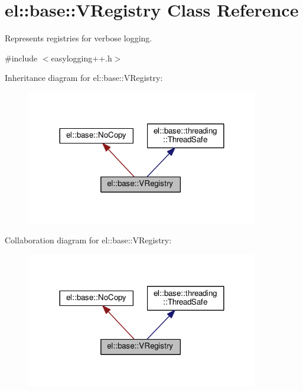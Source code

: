 \hypertarget{classel_1_1base_1_1_v_registry}{}\section{el\+:\+:base\+:\+:V\+Registry Class Reference}
\label{classel_1_1base_1_1_v_registry}


Represents registries for verbose logging.  




{\ttfamily \#include $<$easylogging++.\+h$>$}



Inheritance diagram for el\+:\+:base\+:\+:V\+Registry\+:
\nopagebreak
\begin{figure}[H]
\begin{center}
\leavevmode
\includegraphics[width=288pt]{classel_1_1base_1_1_v_registry__inherit__graph}
\end{center}
\end{figure}


Collaboration diagram for el\+:\+:base\+:\+:V\+Registry\+:
\nopagebreak
\begin{figure}[H]
\begin{center}
\leavevmode
\includegraphics[width=288pt]{classel_1_1base_1_1_v_registry__coll__graph}
\end{center}
\end{figure}
